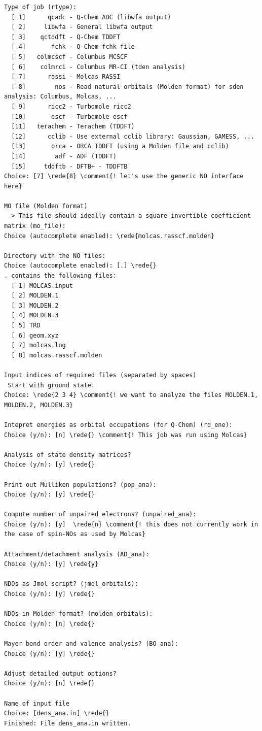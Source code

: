 \documentclass[DIV=12,headings=normal]{scrartcl}
\newcommand{\comment}[1]{\textcolor{blue}{#1}}
\newcommand{\redl}[1]{{\textcolor{red}{\underline{#1}}}}
\newcommand{\rede}[1]{\redl{#1 <ENTER>}}
\newcounter{number}
\begin{document}
\scriptsize
\begin{Verbatim}[commandchars=\\\{\}]
Type of job (rtype):
  [ 1]      qcadc - Q-Chem ADC (libwfa output)
  [ 2]     libwfa - General libwfa output
  [ 3]    qctddft - Q-Chem TDDFT
  [ 4]       fchk - Q-Chem fchk file
  [ 5]   colmcscf - Columbus MCSCF
  [ 6]    colmrci - Columbus MR-CI (tden analysis)
  [ 7]      rassi - Molcas RASSI
  [ 8]        nos - Read natural orbitals (Molden format) for sden analysis: Columbus, Molcas, ...
  [ 9]      ricc2 - Turbomole ricc2
  [10]       escf - Turbomole escf
  [11]   terachem - Terachem (TDDFT)
  [12]      cclib - Use external cclib library: Gaussian, GAMESS, ...
  [13]       orca - ORCA TDDFT (using a Molden file and cclib)
  [14]        adf - ADF (TDDFT)
  [15]     tddftb - DFTB+ - TDDFTB
Choice: [7] \rede{8} \comment{! let's use the generic NO interface here}

MO file (Molden format)
 -> This file should ideally contain a square invertible coefficient matrix (mo_file):
Choice (autocomplete enabled): \rede{molcas.rasscf.molden}

Directory with the NO files:
Choice (autocomplete enabled): [.] \rede{}
. contains the following files:
  [ 1] MOLCAS.input
  [ 2] MOLDEN.1
  [ 3] MOLDEN.2
  [ 4] MOLDEN.3
  [ 5] TRD
  [ 6] geom.xyz
  [ 7] molcas.log
  [ 8] molcas.rasscf.molden

Input indices of required files (separated by spaces)
 Start with ground state.
Choice: \rede{2 3 4} \comment{! we want to analyze the files MOLDEN.1, MOLDEN.2, MOLDEN.3}

Intepret energies as orbital occupations (for Q-Chem) (rd_ene):
Choice (y/n): [n] \rede{} \comment{! This job was run using Molcas}

Analysis of state density matrices?
Choice (y/n): [y] \rede{}

Print out Mulliken populations? (pop_ana):
Choice (y/n): [y] \rede{}

Compute number of unpaired electrons? (unpaired_ana):
Choice (y/n): [y]  \rede{n} \comment{! this does not currently work in the case of spin-NOs as used by Molcas}

Attachment/detachment analysis (AD_ana):
Choice (y/n): [y] \rede{y}

NDOs as Jmol script? (jmol_orbitals):
Choice (y/n): [y] \rede{}

NDOs in Molden format? (molden_orbitals):
Choice (y/n): [n] \rede{}

Mayer bond order and valence analysis? (BO_ana):
Choice (y/n): [y] \rede{}

Adjust detailed output options?
Choice (y/n): [n] \rede{}

Name of input file
Choice: [dens_ana.in] \rede{}
Finished: File dens_ana.in written.
\end{Verbatim}
\normalsize
\end{document}

